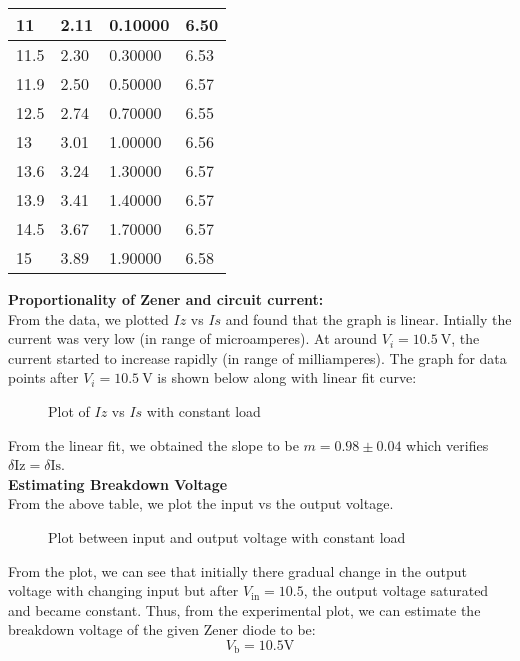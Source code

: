 \documentclass{scrartcl}
\begin{document}
\begin{longtable}{|l|l|l|l|}
        11     & 2.11    & 0.10000       & 6.50    \\ \hline
        11.5   & 2.30    & 0.30000       & 6.53    \\ \hline
        11.9   & 2.50    & 0.50000       & 6.57    \\ \hline
        12.5   & 2.74    & 0.70000       & 6.55    \\ \hline
        13     & 3.01    & 1.00000       & 6.56    \\ \hline
        13.6   & 3.24    & 1.30000       & 6.57    \\ \hline
        13.9   & 3.41    & 1.40000       & 6.57    \\ \hline
        14.5   & 3.67    & 1.70000       & 6.57    \\ \hline
        15     & 3.89    & 1.90000       & 6.58    \\ \hline
        \end{longtable}
        
\noindent
\textbf{Proportionality of Zener and circuit current:}\\[0.3cm]
From the data, we plotted $Iz$ vs $Is$ and found that the graph is linear. Intially the current was very low (in range of microamperes). At around $V_i = 10.5 \ \mathrm{V}$, the current started to increase rapidly (in range of milliamperes). The graph for data points after $V_i = 10.5 \ \mathrm{V}$ is shown below along with linear fit curve:
\begin{figure}[H]
        \centering
        
        \caption{Plot of $Iz$ vs $Is$ with constant load}
\end{figure}
\noindent
From the linear fit, we obtained the slope to be $m = 0.98\pm0.04$ which verifies $\delta \mathrm{Iz} = \delta \mathrm{Is}$.\\[0.3cm]
\textbf{Estimating Breakdown Voltage}\\[0.3cm]
From the above table, we plot the input vs the output voltage. 
\begin{figure}[H]
        \centering
        
        \caption{Plot between input and output voltage with constant load}
\end{figure}
\noindent
From the plot, we can see that initially there gradual change in the output voltage with changing input but after $V_{\mathrm{in}} = 10.5$, the output voltage saturated and became constant. Thus, from the experimental plot, we can estimate the breakdown voltage of the given Zener diode to be:
$$\boxed{V_\mathrm{b} = 10.5 \mathrm{V}}$$
\end{document}

